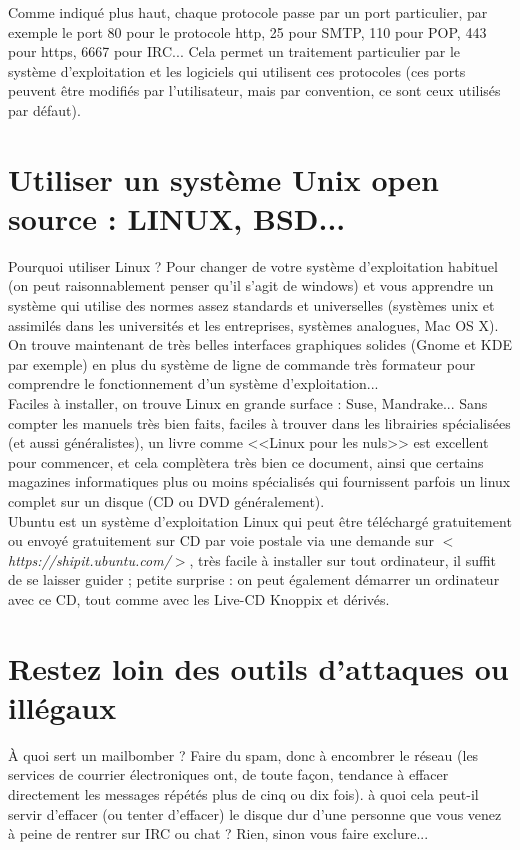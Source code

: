\documentclass[11pt,twoside,a4paper]{article}
\begin{document}
	Comme indiqu{\'e} plus haut, chaque protocole passe par un port particulier, par exemple le port 80 pour le protocole http, 25 pour SMTP, 110 pour POP, 443 pour https, 6667 pour IRC... Cela permet un traitement particulier par le syst{\`e}me d'exploitation et les logiciels qui utilisent ces protocoles (ces ports peuvent {\^e}tre modifi{\'e}s  par l'utilisateur, mais par convention, ce sont ceux utilis{\'e}s par d{\'e}faut).~\\

\section{Utiliser un syst{\`e}me Unix open source : LINUX, BSD...}
		Pourquoi utiliser Linux ? Pour changer de votre syst{\`e}me d'exploitation habituel (on peut raisonnablement penser qu'il s'agit de windows) et vous apprendre un syst{\`e}me qui utilise des normes assez standards et universelles (syst{\`e}mes unix et assimil{\'e}s dans les universit{\'e}s et les entreprises, syst{\`e}mes analogues, Mac OS X). On trouve maintenant de tr{\`e}s belles interfaces graphiques solides (Gnome et KDE par exemple) en plus du syst{\`e}me de ligne de commande tr{\`e}s formateur pour comprendre le fonctionnement d'un syst{\`e}me d'exploitation...~\\

		Faciles {\`a} installer, on trouve Linux en grande surface : Suse, Mandrake... Sans compter les manuels tr{\`e}s bien faits, faciles {\`a} trouver dans les librairies sp{\'e}cialis{\'e}es (et aussi g{\'e}n{\'e}ralistes), un livre comme <<Linux pour les nuls>> est excellent pour commencer, et cela compl{\`e}tera tr{\`e}s bien ce document, ainsi que certains magazines informatiques plus ou moins sp{\'e}cialis{\'e}s qui fournissent parfois un linux complet sur un disque (CD ou DVD g{\'e}n{\'e}ralement).~\\

		Ubuntu est un syst{\`e}me d'exploitation Linux qui peut {\^e}tre t{\'e}l{\'e}charg{\'e} gratuitement ou envoy{\'e} gratuitement sur CD par voie postale via une demande sur $<$\emph{https://shipit.ubuntu.com/}$>$, tr{\`e}s facile {\`a} installer sur tout ordinateur, il suffit de se laisser guider  ; petite surprise : on peut {\'e}galement d{\'e}marrer un ordinateur avec ce CD, tout comme avec les Live-CD Knoppix et d{\'e}riv{\'e}s. ~\\

\clearpage

\section{Restez loin des outils d'attaques ou ill{\'e}gaux}
		{\`A} quoi sert un mailbomber ? Faire du spam, donc {\`a} encombrer le r{\'e}seau (les services de courrier {\'e}lectroniques ont, de toute fa\c{c}on, tendance {\`a} effacer directement les messages r{\'e}p{\'e}t{\'e}s plus de cinq ou dix fois). {\`a} quoi cela peut-il servir d'effacer (ou tenter d'effacer) le disque dur d'une personne que vous venez {\`a} peine de rentrer sur IRC ou chat ? Rien, sinon vous faire exclure... ~\\
\end{document}
